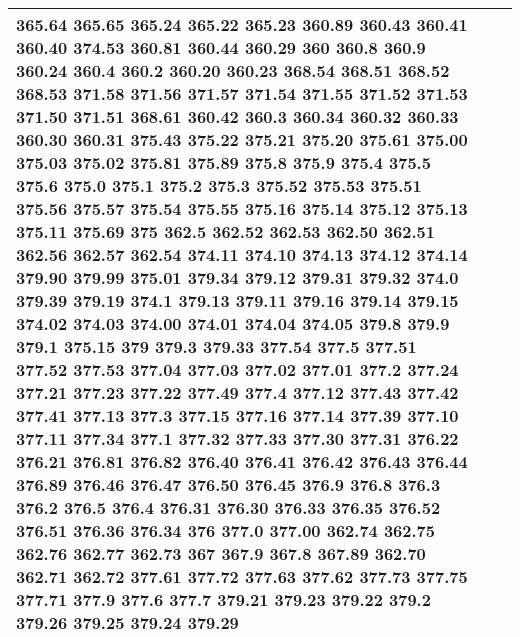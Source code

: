 \begin{longtable}{|R{.05in}|L{.5in}||L{5.75in}|}
365.64 365.65 365.24 365.22 365.23 360.89 360.43 360.41 360.40 374.53 360.81 360.44 360.29 360 360.8 360.9 360.24 360.4 360.2 360.20 360.23 368.54 368.51 368.52 368.53 371.58 371.56 371.57 371.54 371.55 371.52 371.53 371.50 371.51 368.61 360.42 360.3 360.34 360.32 360.33 360.30 360.31 375.43 375.22 375.21 375.20 375.61 375.00 375.03 375.02 375.81 375.89 375.8 375.9 375.4 375.5 375.6 375.0 375.1 375.2 375.3 375.52 375.53 375.51 375.56 375.57 375.54 375.55 375.16 375.14 375.12 375.13 375.11 375.69 375 362.5 362.52 362.53 362.50 362.51 362.56 362.57 362.54 374.11 374.10 374.13 374.12 374.14 379.90 379.99 375.01 379.34 379.12 379.31 379.32 374.0 379.39 379.19 374.1 379.13 379.11 379.16 379.14 379.15 374.02 374.03 374.00 374.01 374.04 374.05 379.8 379.9 379.1 375.15 379 379.3 379.33 377.54 377.5 377.51 377.52 377.53 377.04 377.03 377.02 377.01 377.2 377.24 377.21 377.23 377.22 377.49 377.4 377.12 377.43 377.42 377.41 377.13 377.3 377.15 377.16 377.14 377.39 377.10 377.11 377.34 377.1 377.32 377.33 377.30 377.31 376.22 376.21 376.81 376.82 376.40 376.41 376.42 376.43 376.44 376.89 376.46 376.47 376.50 376.45 376.9 376.8 376.3 376.2 376.5 376.4 376.31 376.30 376.33 376.35 376.52 376.51 376.36 376.34 376 377.0 377.00 362.74 362.75 362.76 362.77 362.73 367 367.9 367.8 367.89 362.70 362.71 362.72 377.61 377.72 377.63 377.62 377.73 377.75 377.71 377.9 377.6 377.7 379.21 379.23 379.22 379.2 379.26 379.25 379.24 379.29\\\hline

\end{longtable}
